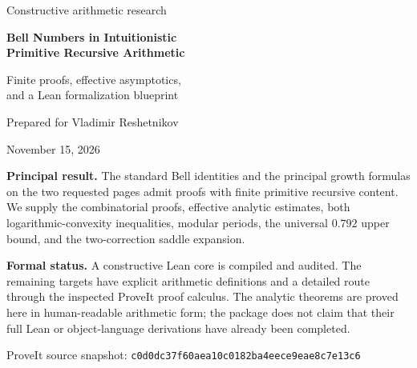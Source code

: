 \documentclass[11pt]{article}
\theoremstyle{definition}
\theoremstyle{remark}
\numberwithin{equation}{section}
\begin{document}
\hypersetup{pageanchor=false}
\begin{titlepage}
\centering
\vspace*{1.2cm}
{\Large Constructive arithmetic research\par}
\vspace{1.1cm}
{\huge\bfseries Bell Numbers in Intuitionistic\\[8pt]
Primitive Recursive Arithmetic\par}
\vspace{0.8cm}
{\Large Finite proofs, effective asymptotics,\\[5pt]
and a Lean formalization blueprint\par}
\vspace{1.1cm}
{\large Prepared for Vladimir Reshetnikov\par}
\vspace{0.3cm}
{\large November 15, 2026\par}
\vfill
\begin{minipage}{0.88\textwidth}
\textbf{Principal result.} The standard Bell identities and the principal
growth formulas on the two requested pages admit proofs with finite
primitive recursive content. We supply the combinatorial proofs, effective
analytic estimates, both logarithmic-convexity inequalities, modular periods,
the universal $0.792$ upper bound, and the two-correction saddle expansion.

\medskip
\textbf{Formal status.} A constructive Lean core is compiled and audited.
The remaining targets have explicit arithmetic definitions and a detailed
route through the inspected ProveIt proof calculus. The analytic theorems
are proved here in human-readable arithmetic form; the package does not
claim that their full Lean or object-language derivations have already
been completed.
\end{minipage}
\vfill
{\small ProveIt source snapshot:\quad
\texttt{c0d0dc37f60aea10c0182ba4eece9eae8c7e13c6}\par}
\end{titlepage}
\hypersetup{pageanchor=true}
\end{document}

